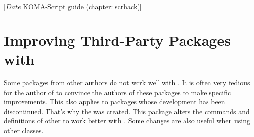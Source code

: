 %
%
%
%
%
%
%
%
% 
%
%
%
%

                 [$Date$
                  KOMA-Script guide (chapter: scrhack)]

\chapter{Improving Third-Party Packages with }

\BeginIndexGroup
{}
Some packages from other authors do not work well with \KOMAScript{}. It is
often very tedious for the author of \KOMAScript{} to convince the authors of
these packages to make specific improvements. This also applies to packages
whose development has been discontinued. That's why the  was
created. This package alters the commands and definitions of other to work
better with \KOMAScript{}. Some changes are also useful when using other
classes.

